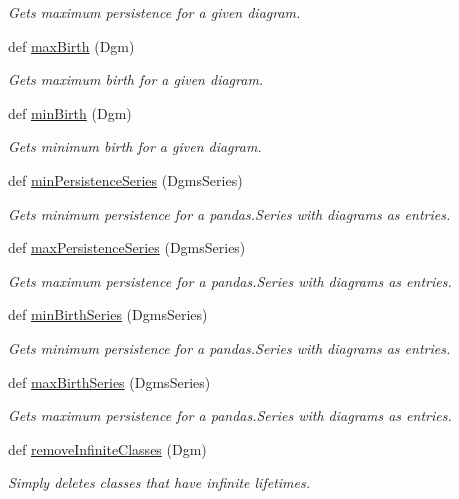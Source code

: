 \begin{DoxyCompactItemize}
\begin{DoxyCompactList}\small\item\em Gets maximum persistence for a given diagram. \end{DoxyCompactList}\item
def \hyperlink{namespaceteaspoon_1_1_t_d_a_1_1_persistence_aa91a12cbd748fc2f13944fbc653739d1}{max\+Birth} (Dgm)
\begin{DoxyCompactList}\small\item\em Gets maximum birth for a given diagram. \end{DoxyCompactList}\item
def \hyperlink{namespaceteaspoon_1_1_t_d_a_1_1_persistence_a4cb4a0b96d87e48f0d1170fd0252a9ae}{min\+Birth} (Dgm)
\begin{DoxyCompactList}\small\item\em Gets minimum birth for a given diagram. \end{DoxyCompactList}\item
def \hyperlink{namespaceteaspoon_1_1_t_d_a_1_1_persistence_a5ce3d1bee444c695661556eb59f70d90}{min\+Persistence\+Series} (Dgms\+Series)
\begin{DoxyCompactList}\small\item\em Gets minimum persistence for a pandas.\+Series with diagrams as entries. \end{DoxyCompactList}\item
def \hyperlink{namespaceteaspoon_1_1_t_d_a_1_1_persistence_a6413fcc8a65a5422547f264331eb5c7d}{max\+Persistence\+Series} (Dgms\+Series)
\begin{DoxyCompactList}\small\item\em Gets maximum persistence for a pandas.\+Series with diagrams as entries. \end{DoxyCompactList}\item
def \hyperlink{namespaceteaspoon_1_1_t_d_a_1_1_persistence_a1db04f6a997b34a930bc3e28d2cb709e}{min\+Birth\+Series} (Dgms\+Series)
\begin{DoxyCompactList}\small\item\em Gets minimum persistence for a pandas.\+Series with diagrams as entries. \end{DoxyCompactList}\item
def \hyperlink{namespaceteaspoon_1_1_t_d_a_1_1_persistence_a866a47a538d7042da1de685bed83d00e}{max\+Birth\+Series} (Dgms\+Series)
\begin{DoxyCompactList}\small\item\em Gets maximum persistence for a pandas.\+Series with diagrams as entries. \end{DoxyCompactList}\item
\mbox{\label{namespaceteaspoon_1_1_t_d_a_1_1_persistence_abdeeb8bb1d1c2c82b26d2e55b0fd42a3}}
def \hyperlink{namespaceteaspoon_1_1_t_d_a_1_1_persistence_abdeeb8bb1d1c2c82b26d2e55b0fd42a3}{remove\+Infinite\+Classes} (Dgm)
\begin{DoxyCompactList}\small\item\em Simply deletes classes that have infinite lifetimes. \end{DoxyCompactList}\end{DoxyCompactItemize}
